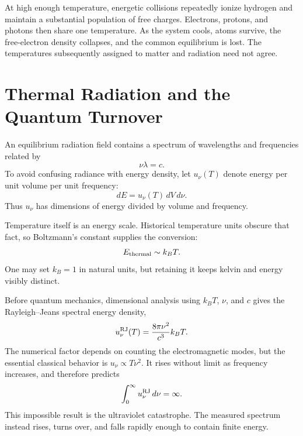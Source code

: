 At high enough temperature, energetic collisions repeatedly ionize hydrogen and maintain a substantial population of free charges. Electrons, protons, and photons then share one temperature. As the system cools, atoms survive, the free-electron density collapses, and the common equilibrium is lost. The temperatures subsequently assigned to matter and radiation need not agree.

\begin{classroomqa}
\end{classroomqa}

\section{Thermal Radiation and the Quantum Turnover}

An equilibrium radiation field contains a spectrum of wavelengths and frequencies related by
\begin{equation}
\nu\lambda=c.
\end{equation}
To avoid confusing radiance with energy density, let \(u_\nu(T)\) denote energy per unit volume per unit frequency:
\begin{equation}
dE=u_\nu(T)\,dV\,d\nu.
\label{eq:c07-spectral-density}
\end{equation}
Thus \(u_\nu\) has dimensions of energy divided by volume and frequency.

Temperature itself is an energy scale. Historical temperature units obscure that fact, so Boltzmann's constant supplies the conversion:
\begin{equation}
E_{\rm thermal}\sim k_B T.
\end{equation}
One may set \(k_B=1\) in natural units, but retaining it keeps kelvin and energy visibly distinct.

Before quantum mechanics, dimensional analysis using \(k_BT\), \(\nu\), and \(c\) gives the Rayleigh--Jeans spectral energy density,
\begin{equation}
u_\nu^{\rm RJ}(T)=\frac{8\pi\nu^2}{c^3}k_BT.
\label{eq:c07-rayleigh-jeans}
\end{equation}
The numerical factor depends on counting the electromagnetic modes, but the essential classical behavior is \(u_\nu\propto T\nu^2\). It rises without limit as frequency increases, and therefore predicts
\begin{equation}
\int_0^\infty u_\nu^{\rm RJ}\,d\nu=\infty.
\end{equation}
This impossible result is the ultraviolet catastrophe. The measured spectrum instead rises, turns over, and falls rapidly enough to contain finite energy.

